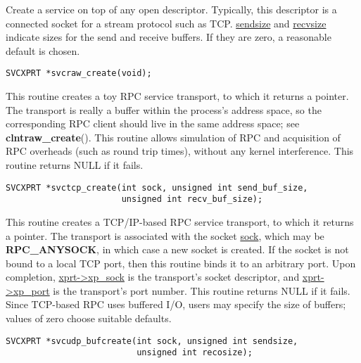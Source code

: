 \documentclass[]{article}
\let\realtextbf=\textbf
\renewcommand{\textbf}[1]{\textcolor{boldcolor}{\realtextbf{#1}}}
\renewcommand{\emph}[1]{\underline{#1}}
\begin{document}
\begin{description}
\itemsep1pt\parskip0pt
\item[]
Create a service on top of any open descriptor. Typically, this
descriptor is a connected socket for a stream protocol such as TCP.
\emph{sendsize} and \emph{recvsize} indicate sizes for the send and
receive buffers. If they are zero, a reasonable default is chosen.
\end{description}

\begin{verbatim}
SVCXPRT *svcraw_create(void);
\end{verbatim}

\begin{description}
\itemsep1pt\parskip0pt
\item[]
This routine creates a toy RPC service transport, to which it returns a
pointer. The transport is really a buffer within the process's address
space, so the corresponding RPC client should live in the same address
space; see \textbf{clntraw\_create}(). This routine allows simulation of
RPC and acquisition of RPC overheads (such as round trip times), without
any kernel interference. This routine returns NULL if it fails.
\end{description}

\begin{verbatim}
SVCXPRT *svctcp_create(int sock, unsigned int send_buf_size,
                       unsigned int recv_buf_size);
\end{verbatim}

\begin{description}
\itemsep1pt\parskip0pt
\item[]
This routine creates a TCP/IP-based RPC service transport, to which it
returns a pointer. The transport is associated with the socket
\emph{sock}, which may be \textbf{RPC\_ANYSOCK}, in which case a new
socket is created. If the socket is not bound to a local TCP port, then
this routine binds it to an arbitrary port. Upon completion,
\emph{xprt-\textgreater{}xp\_sock} is the transport's socket descriptor,
and \emph{xprt-\textgreater{}xp\_port} is the transport's port number.
This routine returns NULL if it fails. Since TCP-based RPC uses buffered
I/O, users may specify the size of buffers; values of zero choose
suitable defaults.
\end{description}

\begin{verbatim}
SVCXPRT *svcudp_bufcreate(int sock, unsigned int sendsize,
                          unsigned int recosize);
\end{verbatim}
\end{document}
